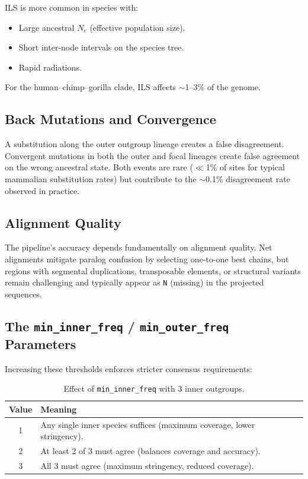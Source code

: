 \documentclass[11pt,a4paper]{article}
\begin{document}
ILS is more common in species with:
\begin{itemize}[leftmargin=2em]
    \item Large ancestral $N_e$ (effective population size).
    \item Short inter-node intervals on the species tree.
    \item Rapid radiations.
\end{itemize}

For the human--chimp--gorilla clade, ILS affects $\sim$1--3\% of the genome.

\subsection{Back Mutations and Convergence}

A substitution along the outer outgroup lineage creates a false disagreement.  Convergent mutations in both the outer and focal lineages create false agreement on the wrong ancestral state.  Both events are rare ($\ll$1\% of sites for typical mammalian substitution rates) but contribute to the $\sim$0.1\% disagreement rate observed in practice.

\subsection{Alignment Quality}

The pipeline's accuracy depends fundamentally on alignment quality.  Net alignments mitigate paralog confusion by selecting one-to-one best chains, but regions with segmental duplications, transposable elements, or structural variants remain challenging and typically appear as \texttt{N} (missing) in the projected sequences.

\subsection{The \texttt{min\_inner\_freq} / \texttt{min\_outer\_freq} Parameters}

Increasing these thresholds enforces stricter consensus requirements:

\begin{table}[H]
\centering
\caption{Effect of \texttt{min\_inner\_freq} with 3 inner outgroups.}
\begin{tabular}{cl}
\toprule
\textbf{Value} & \textbf{Meaning} \\
\midrule
1 & Any single inner species suffices (maximum coverage, lower stringency). \\
2 & At least 2 of 3 must agree (balances coverage and accuracy). \\
3 & All 3 must agree (maximum stringency, reduced coverage). \\
\bottomrule
\end{tabular}
\end{table}
\end{document}
